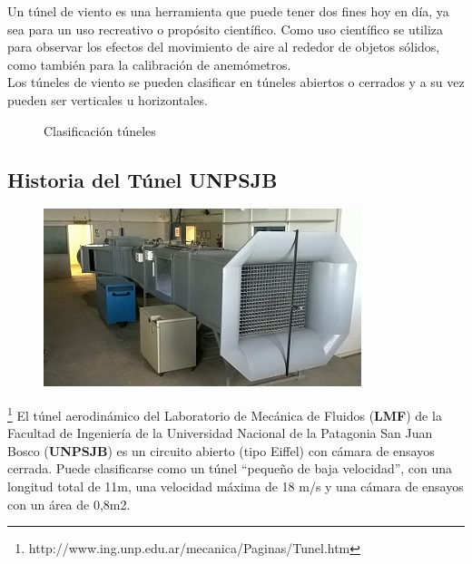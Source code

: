 

\begin{minipage}[t]{.3\textwidth}
	\centering{}
	\label{fig:tunelRec}
\end{minipage}	
\begin{minipage}[t]{.7\textwidth}

Un túnel de viento es una herramienta que puede tener dos fines hoy en día, ya sea para un uso recreativo o propósito científico.
Como uso científico se utiliza para observar los efectos del movimiento de aire al rededor de objetos sólidos, como también para la calibración de anemómetros.\\
Los túneles de viento se pueden clasificar en túneles abiertos o cerrados y a su vez pueden ser verticales u horizontales. 
\end{minipage}

\begin{figure}[htbp]
    \centering
    \caption{Clasificación túneles} \label{fig:abierto}
    \end{figure}


\subsection{Historia del Túnel UNPSJB}

\begin{figure} 
	\begin{center}
		\includegraphics[scale=0.45]{tunel_unpsjb.JPG}
		\label{fig:tunelUni}
	\end{center}
	\vspace{-20pt}
	\end{figure}


\footnote{http://www.ing.unp.edu.ar/mecanica/Paginas/Tunel.htm} 
	El túnel aerodinámico del Laboratorio de Mecánica de Fluidos (\textbf{LMF}) de la Facultad de Ingeniería de la Universidad Nacional de la Patagonia San Juan Bosco (\textbf{UNPSJB}) es un circuito abierto (tipo Eiffel) con cámara de ensayos cerrada. Puede clasificarse como un túnel “pequeño de baja velocidad”, con una longitud total de 11m, una velocidad máxima de 18 m/s y una cámara de ensayos con un área de 0,8m2.
	
